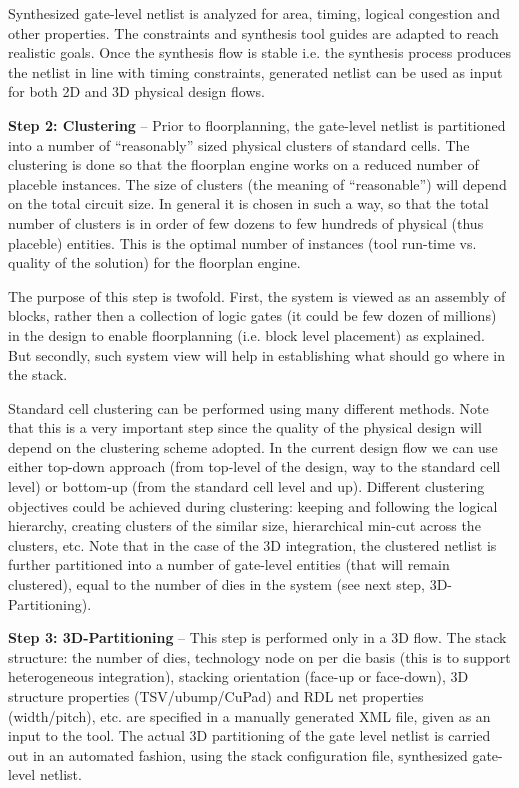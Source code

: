 Synthesized gate-level netlist is analyzed for area, timing, logical congestion and other properties. The constraints and synthesis tool guides are adapted to reach realistic goals. Once the synthesis flow is stable i.e. the synthesis process produces the netlist in line with timing constraints, generated netlist can be used as input for both 2D and 3D physical design flows.

\textbf{Step 2: Clustering} – Prior to floorplanning, the gate-level netlist is partitioned into a number of  “reasonably” sized physical clusters of standard cells. The clustering is done so that the floorplan engine works on a reduced number of placeble instances. The size of clusters (the meaning of “reasonable”) will depend on the total circuit size. In general it is chosen in such a way, so that the total number of clusters is in order of few dozens to few hundreds of physical (thus placeble) entities. This is the optimal number of instances (tool run-time vs. quality of the solution) for the floorplan engine.

The purpose of this step is twofold. First, the system is viewed as an assembly of blocks, rather then a collection of logic gates (it could be few dozen of millions) in the design to enable floorplanning (i.e. block level placement) as explained. But secondly, such system view will help in establishing what should go where in the stack.

Standard cell clustering can be performed using many different methods. Note that this is a very important step since the quality of the physical design will depend on the clustering scheme adopted. In the current design flow we can use either top-down approach (from top-level of the design, way to the standard cell level) or bottom-up (from the standard cell level and up). Different clustering objectives could be achieved during clustering: keeping and following the logical hierarchy, creating clusters of the similar size, hierarchical min-cut across the clusters, etc. Note that in the case of the 3D integration, the clustered netlist is further partitioned into a number of gate-level entities (that will remain clustered), equal to the number of dies in the system (see next step, 3D-Partitioning).

\textbf{Step 3: 3D-Partitioning} – This step is performed only in a 3D flow. The stack structure: the number of dies, technology node on per die basis (this is to support heterogeneous integration), stacking orientation (face-up or face-down), 3D structure properties (TSV/ubump/CuPad) and RDL net properties (width/pitch), etc. are specified in a manually generated XML file, given as an input to the tool. The actual 3D partitioning of the gate level netlist is carried out in an automated fashion, using the stack configuration file, synthesized gate-level netlist.

